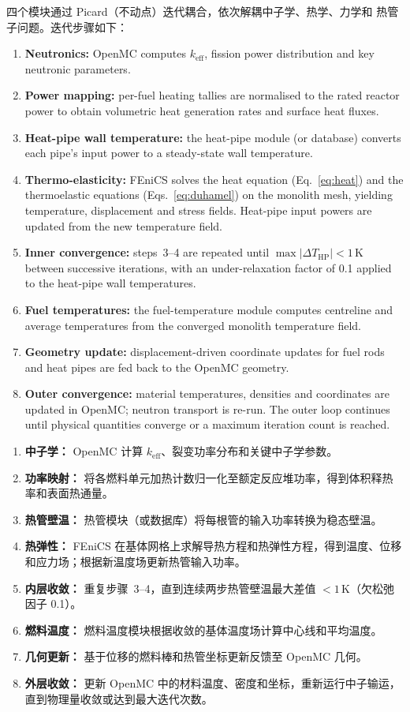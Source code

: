 \documentclass[11pt,a4paper]{article}
\newcommand{\keff}{\ensuremath{k_{\mathrm{eff}}}}
\begin{document}
四个模块通过 Picard（不动点）迭代耦合，依次解耦中子学、热学、力学和
热管子问题。迭代步骤如下：

\begin{enumerate}\setlength{\itemsep}{0.2em}
\item \textbf{Neutronics:} OpenMC computes \keff{}, fission power
  distribution and key neutronic parameters.
\item \textbf{Power mapping:} per-fuel heating tallies are normalised to
  the rated reactor power to obtain volumetric heat generation rates and
  surface heat fluxes.
\item \textbf{Heat-pipe wall temperature:} the heat-pipe module (or
  database) converts each pipe's input power to a steady-state wall
  temperature.
\item \textbf{Thermo-elasticity:} FEniCS solves the heat equation
  (Eq.~\ref{eq:heat}) and the thermoelastic equations
  (Eqs.~\ref{eq:duhamel}) on the monolith mesh, yielding temperature,
  displacement and stress fields. Heat-pipe input powers are updated from
  the new temperature field.
\item \textbf{Inner convergence:} steps~3--4 are repeated until
  $\max|\Delta T_{\mathrm{HP}}| < 1$\,K between successive iterations,
  with an under-relaxation factor of 0.1 applied to the heat-pipe wall
  temperatures.
\item \textbf{Fuel temperatures:} the fuel-temperature module computes
  centreline and average temperatures from the converged monolith
  temperature field.
\item \textbf{Geometry update:} displacement-driven coordinate updates
  for fuel rods and heat pipes are fed back to the OpenMC geometry.
\item \textbf{Outer convergence:} material temperatures, densities and
  coordinates are updated in OpenMC; neutron transport is re-run.
  The outer loop continues until physical quantities converge or a
  maximum iteration count is reached.
\end{enumerate}

\begin{enumerate}\setlength{\itemsep}{0.2em}
\item \textbf{中子学：} OpenMC 计算 \keff{}、裂变功率分布和关键中子学参数。
\item \textbf{功率映射：} 将各燃料单元加热计数归一化至额定反应堆功率，得到体积释热率和表面热通量。
\item \textbf{热管壁温：} 热管模块（或数据库）将每根管的输入功率转换为稳态壁温。
\item \textbf{热弹性：} FEniCS 在基体网格上求解导热方程和热弹性方程，得到温度、位移和应力场；根据新温度场更新热管输入功率。
\item \textbf{内层收敛：} 重复步骤~3--4，直到连续两步热管壁温最大差值 $< 1$\,K（欠松弛因子 0.1）。
\item \textbf{燃料温度：} 燃料温度模块根据收敛的基体温度场计算中心线和平均温度。
\item \textbf{几何更新：} 基于位移的燃料棒和热管坐标更新反馈至 OpenMC 几何。
\item \textbf{外层收敛：} 更新 OpenMC 中的材料温度、密度和坐标，重新运行中子输运，直到物理量收敛或达到最大迭代次数。
\end{enumerate}
\end{document}
